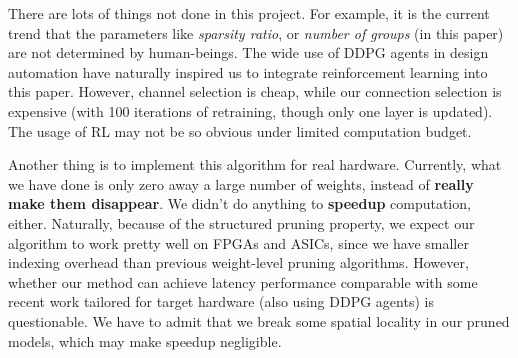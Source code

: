 \documentclass{acmtog} %
\begin{document}
There are lots of things not done in this project. For example, it is the current trend that the parameters like \emph{sparsity ratio}, or \emph{number of groups} (in this paper) are not determined by human-beings. The wide use of DDPG agents in design automation \cite{amc} have naturally inspired us to integrate reinforcement learning into this paper. However, channel selection is cheap, while our connection selection is expensive (with 100 iterations of retraining, though only one layer is updated). The usage of RL may not be so obvious under limited computation budget.

Another thing is to implement this algorithm for real hardware. Currently, what we have done is only zero away a large number of weights, instead of \textbf{really make them disappear}. We didn't do anything to \textbf{speedup} computation, either. Naturally, because of the structured pruning property, we expect our algorithm to work pretty well on FPGAs and ASICs, since we have smaller indexing overhead than previous weight-level pruning algorithms. However, whether our method can achieve latency performance comparable with some recent work tailored for target hardware (also using DDPG agents) is questionable. We have to admit that we break some spatial locality in our pruned models, which may make speedup negligible.



\end{document}
